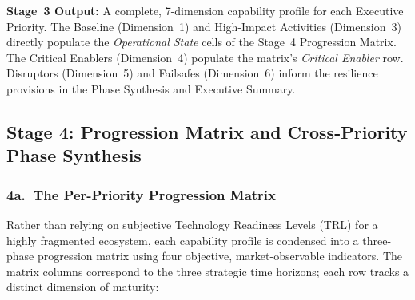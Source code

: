 \documentclass{ieeeaccess}
\begin{document}
\begin{enumerate}
\end{enumerate}

\noindent\textbf{Stage~3 Output:} A complete, 7-dimension capability profile
for each Executive Priority. The Baseline (Dimension~1) and High-Impact
Activities (Dimension~3) directly populate the \emph{Operational State} cells
of the Stage~4 Progression Matrix. The Critical Enablers (Dimension~4) populate
the matrix's \emph{Critical Enabler} row. Disruptors (Dimension~5) and
Failsafes (Dimension~6) inform the resilience provisions in the Phase
Synthesis and Executive Summary.

\subsection{Stage 4: Progression Matrix and Cross-Priority Phase Synthesis}
\label{sec:matrix}

\subsubsection*{4a.\ The Per-Priority Progression Matrix}
Rather than relying on subjective Technology Readiness Levels (TRL) for a
highly fragmented ecosystem, each capability profile is condensed into a
three-phase progression matrix using four objective, market-observable
indicators. The matrix columns correspond to the three strategic time
horizons; each row tracks a distinct dimension of maturity:
\end{document}
